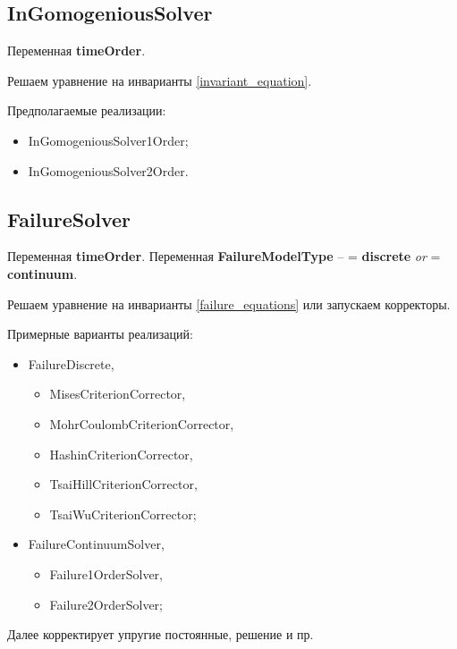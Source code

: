 \documentclass[a4paper,12pt]{article}
\numberwithin{equation}{section}
\begin{document}
\subsection{InGomogeniousSolver}
	Переменная \textbf{timeOrder}.
	
	Решаем уравнение на инварианты \eqref{invariant_equation}.
	
	Предполагаемые реализации:
		\begin{itemize}
			\item{InGomogeniousSolver1Order;}
			\item{InGomogeniousSolver2Order.}
		\end{itemize}

\subsection{FailureSolver}
	Переменная \textbf{timeOrder}.
	Переменная \textbf{FailureModelType} -- = \textbf{discrete} \textit{or} = \textbf{continuum}.
	
	Решаем уравнение на инварианты \eqref{failure_equations} или запускаем корректоры.
	
	Примерные варианты реализаций:
	\begin{itemize}
		\item{FailureDiscrete,}
		\begin{itemize}
			\item{MisesCriterionCorrector,}
			\item{MohrCoulombCriterionCorrector,}
			\item{HashinCriterionCorrector,}
			\item{TsaiHillCriterionCorrector,}
			\item{TsaiWuCriterionCorrector;}
		\end{itemize}
		\item{FailureContinuumSolver,}
		\begin{itemize}
			\item{Failure1OrderSolver,}
			\item{Failure2OrderSolver;}
		\end{itemize}
	\end{itemize}
	
	Далее корректирует упругие постоянные, решение и пр.
\end{document}
